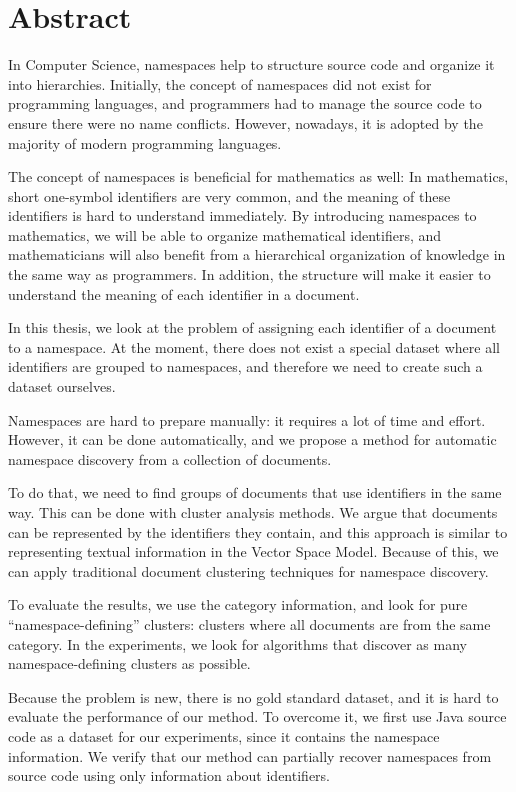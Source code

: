 \section*{Abstract}

In Computer Science, namespaces help to structure source code and
organize it into hierarchies. Initially, the concept of namespaces did not
exist for programming languages, and programmers had to manage the source code
to ensure there were  no name conflicts. However, nowadays, it is adopted by the majority 
of modern programming languages.

The concept of namespaces is beneficial for mathematics as well:
In mathematics, short one-symbol identifiers are very common,
and the meaning of these identifiers is hard to understand immediately.
By introducing namespaces to mathematics, we will be able to organize mathematical 
identifiers, and mathematicians will also benefit from a hierarchical organization of
knowledge in the same way as programmers. In addition, the structure
will make it easier to understand the meaning of each identifier in a document.

In this thesis, we look at the problem of assigning each identifier of a document
to a namespace. At the moment, there does not exist a special dataset where
all identifiers are grouped to namespaces, and therefore we need to create
such a dataset ourselves.


Namespaces are hard to prepare manually: it requires a lot of time and effort.
However, it can be done automatically, and we propose
a method for automatic namespace discovery from a collection of documents.

To do that, we need to find groups of documents that use identifiers in the same way.
This can be done with cluster analysis methods.
We argue that documents can be represented by the identifiers they contain, and this
approach is similar to representing textual information in the Vector Space Model.
Because of this, we can apply traditional document clustering techniques for namespace
discovery.

To evaluate the results, we use the category information, and look for pure
``namespace-defining'' clusters: clusters where all documents are from the same category.
In the experiments, we look for algorithms that discover as many namespace-defining
clusters as possible. 


Because the problem is new, there is no gold standard dataset, and it is
hard to evaluate the performance of our method. To overcome it, we first 
use Java source code as a dataset for our experiments, since it contains the namespace 
information. We verify that our method can partially recover namespaces 
from source code using  only information about identifiers.

